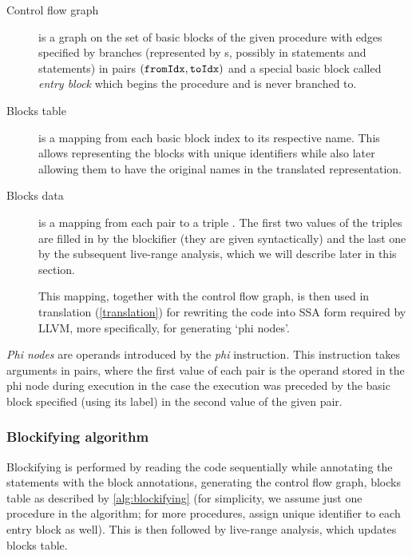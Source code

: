 \begin{description}
    \item[Control flow graph] is a graph on the set of basic blocks of the given procedure with edges specified by branches (represented by s, possibly in  statements and  statements) in pairs $(\mathtt{fromIdx}, \mathtt{toIdx})$ and a special basic block called \emph{entry block} which begins the procedure and is never branched to.

    \item[Blocks table] is a mapping from each basic block index to its respective name. This allows representing the blocks with unique identifiers while also later allowing them to have the original names in the translated representation.

    \item[Blocks data] is a mapping from each pair  to a triple . The first two values of the triples are filled in by the blockifier (they are given syntactically) and the last one by the subsequent live-range analysis, which we will describe later in this section.

    This mapping, together with the control flow graph, is then used in translation (\cref{translation}) for rewriting the code into SSA form required by LLVM, more specifically, for generating `phi nodes'.
\end{description}

\emph{Phi nodes} are operands introduced by the \emph{phi} instruction. This instruction takes arguments in  pairs, where the first value of each pair is the operand stored in the phi node during execution in the case the execution was preceded by the basic block specified (using its label) in the second value of the given pair.

\subsubsection{Blockifying algorithm}

Blockifying is performed by reading the code sequentially while annotating the statements with the block annotations, generating the control flow graph, blocks table as described by \cref{alg:blockifying} (for simplicity, we assume just one procedure in the algorithm; for more procedures, assign unique identifier to each entry block as well). This is then followed by live-range analysis, which updates blocks table.

